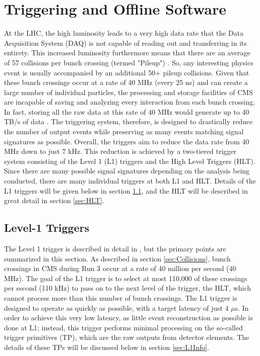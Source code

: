 \documentclass[12pt]{ucsddissertation}
\begin{document}
\chapter{Triggering and Offline Software} \label{chapter:Software}
At the LHC, the high luminosity leads to a very high data rate that the Data Acquisition System (DAQ) is not capable of reading out and transferring in its entirety. This increased luminosity furthermore means that there are an average of 57 collisions per bunch crossing (termed "Pileup") \cite{LHCPRun3TriggerReport}. So, any interesting physics event is usually accompanied by an additional 50+ pileup collisions. Given that these bunch crossings occur at a rate of 40 MHz (every 25 ns) and can create a large number of individual particles, the processing and storage facilities of CMS are incapable of saving and analyzing every interaction from each bunch crossing. In fact, storing all the raw data at this rate of 40 MHz would generate up to 40 TB/s of data \cite{Run3HLTPerformanceConference}. The triggering system, therefore, is designed to drastically reduce the number of output events while preserving as many events matching signal signatures as possible. Overall, the triggers aim to reduce the data rate from 40 MHz down to just 7 kHz. This reduction is achieved by a two-tiered trigger system consisting of the Level 1 (L1) triggers and the High Level Triggers (HLT). Since there are many possible signal signatures depending on the analysis being conducted, there are many individual triggers at both L1 and HLT. Details of the L1 triggers will be given below in section \ref{sec:L1}, and the HLT will be described in great detail in section \ref{sec:HLT}. 
\section{Level-1 Triggers} \label{sec:L1}
The Level 1 trigger is described in detail in \cite{L12020}, but the primary points are summarized in this section. As described in section \ref{sec:Collisions}, bunch crossings in CMS during Run 3 occur at a rate of 40 million per second (40 MHz). The goal of the L1 trigger is to select at most 110,000 of these crossings per second (110 kHz) to pass on to the next level of the trigger, the HLT, which cannot process more than this number of bunch crossings. The L1 trigger is designed to operate as quickly as possible, with a target latency of just 4 $\mu$s. In order to achieve this very low latency, as little event reconstruction as possible is done at L1; instead, this trigger performs minimal processing on the so-called trigger primitives (TP), which are the raw outputs from detector elements. The details of these TPs will be discussed below in section \ref{sec:L1Info}. 
\end{document}
